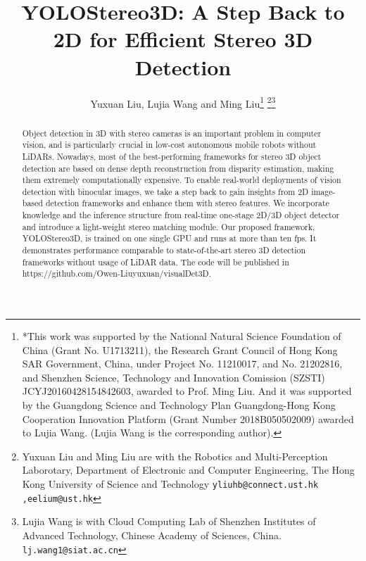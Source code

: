 \documentclass[letterpaper, 10 pt, conference]{ieeeconf}
\title{\LARGE \bf
YOLOStereo3D: A Step Back to 2D for Efficient Stereo 3D Detection
}
\author{Yuxuan Liu, Lujia Wang and Ming Liu\thanks{*This work was supported by the National Natural Science Foundation
of China (Grant No. U1713211), the Research Grant Council of Hong
Kong SAR Government, China, under Project No. 11210017, and No.
21202816, and Shenzhen Science, Technology and Innovation Comission
(SZSTI) JCYJ20160428154842603, awarded to Prof. Ming Liu. And it was supported
by the Guangdong Science and Technology Plan Guangdong-Hong Kong
Cooperation Innovation Platform (Grant Number 2018B050502009) awarded
to Lujia Wang. (Lujia Wang is the corresponding author).} 
\thanks{Yuxuan Liu and Ming Liu are with the Robotics and Multi-Perception Laborotary, 
Department of Electronic and Computer Engineering, The Hong Kong University of Science and Technology
        {\tt\footnotesize yliuhb@connect.ust.hk ,eelium@ust.hk}}\thanks{Lujia Wang is with Cloud Computing Lab of Shenzhen Institutes
of Advanced Technology, Chinese Academy of Sciences, China.
        {\tt\footnotesize lj.wang1@siat.ac.cn}}}
\begin{document}
\maketitle
\thispagestyle{empty}
\pagestyle{empty}


\begin{abstract}

        Object detection in 3D with stereo cameras is an important problem in computer vision, and is particularly crucial in low-cost autonomous mobile robots without LiDARs. 
        Nowadays, most of the best-performing frameworks for stereo 3D object detection are based on dense depth reconstruction from disparity estimation, making them extremely computationally expensive.
        To enable real-world deployments of vision detection with binocular images, we take a step back to gain insights from 2D image-based detection frameworks and enhance them with stereo features.
        We incorporate knowledge and the inference structure from real-time one-stage 2D/3D object detector and introduce a light-weight stereo matching module. 
        Our proposed framework, YOLOStereo3D, is trained on one single GPU and runs at more than ten fps. It demonstrates performance comparable to state-of-the-art stereo 3D detection frameworks without usage of LiDAR data. The code will be published in https://github.com/Owen-Liuyuxuan/visualDet3D.

\end{abstract}
\end{document}
